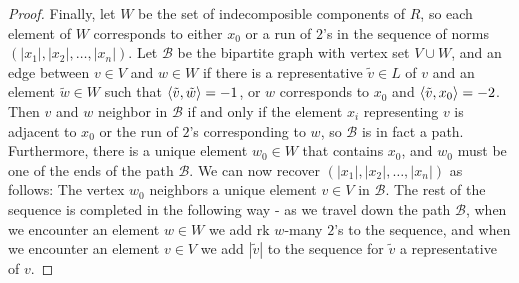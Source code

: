 \begin{proof}
Finally, let $W$ be the set of indecomposible components of $R$, so each element of $W$ corresponds to either $x_0$ or a run of $2$'s in the sequence of norms $(|x_1|,|x_2|,\dots,|x_n|)$. Let $\mathcal{B}$ be the bipartite graph with  vertex set $V \cup W$, and an edge between $v \in V$ and $w \in W$ if there is a representative $\tilde{v} \in L$ of $v$ and an element $\tilde{w} \in W$ such that $\left\langle \tilde{v} , \tilde{w} \right\rangle = -1$, or $w$ corresponds to $x_0$ and $\left\langle \tilde{v} , x_0 \right\rangle = -2$. Then $v$ and $w$ neighbor in $\mathcal B$ if and only if the element $x_i$ representing $v$ is adjacent to $x_0$ or the run of $2$'s corresponding to $w$, so $\mathcal{B}$ is in fact a path. Furthermore, there is a unique element $w_0 \in W$ that contains $x_0$, and $w_0$ must be one of the ends of the path $\mathcal{B}$. We can now recover $(|x_1|,|x_2|,\dots,|x_n|)$ as follows:  The vertex $w_0$ neighbors a unique element $v \in V$ in $\mathcal{B}$. The rest of the sequence is completed in the following way - as we travel down the path $\mathcal{B}$, when we encounter an element $w \in W$ we add $\text{rk } w$-many $2$'s to the sequence, and when we encounter an element $v \in V$ we add $|\tilde{v}|$ to the sequence for $\tilde{v}$ a representative of $v$. 
\end{proof}
